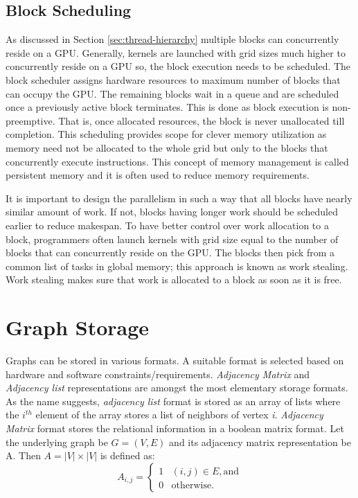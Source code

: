 \subsection{Block Scheduling}\label{sec:block-scheduling}
As discussed in Section \ref{sec:thread-hierarchy} multiple blocks can concurrently reside on a GPU.
Generally, kernels are launched with grid sizes much higher to concurrently reside on a GPU so, the block execution needs to be scheduled.
The block scheduler assigns hardware resources to maximum number of blocks that can occupy the GPU. The remaining blocks wait in a queue and are scheduled once a previously active block terminates.
This is done as block execution is non-preemptive. That is, once allocated resources, the block is never unallocated till completion.
This scheduling provides scope for clever memory utilization as memory need not be allocated to the whole grid but only to the blocks that concurrently execute instructions. This concept of memory management is called persistent memory and it is often used to reduce memory requirements.

It is important to design the parallelism in such a way that all blocks have nearly similar amount of work.
If not, blocks having longer work should be scheduled earlier to reduce makespan.
To have better control over work allocation to a block, programmers often launch kernels with grid size equal to the number of blocks that can concurrently reside on the GPU.
The blocks then pick from a common list of tasks in global memory; this approach is known as work stealing.
Work stealing makes sure that work is allocated to a block as soon as it is free.


\section{Graph Storage}\label{storage-format}
Graphs can be stored in various formats. A suitable format is selected based on hardware and software constraints/requirements.
\textit{Adjacency Matrix} and \textit{Adjacency list} representations are amongst the most elementary storage formats.
As the name suggests, \textit{adjacency list} format is stored as an array of lists where the $i^{th}$ element of the array stores a list of neighbors of vertex \textit{i}.
\textit{Adjacency Matrix} format stores the relational information in a boolean matrix format.
Let the underlying graph be $G=(V,E)$ and its adjacency matrix representation be A.
Then $A = |V|\times|V|$ is defined as:
$$
    A_{i,j}=\begin{cases}
        1 & (i,j) \in E, \text{and}     \\
        0 & \text{otherwise.}
    \end{cases}
$$

